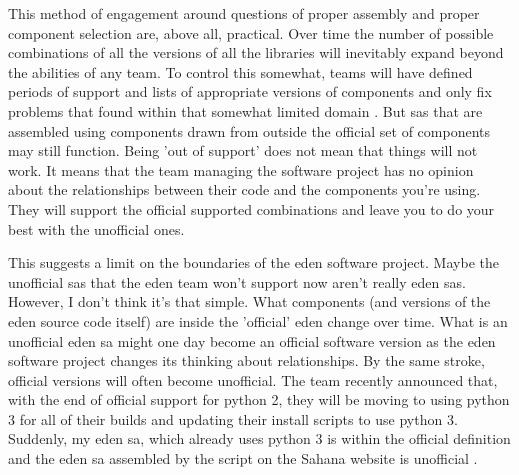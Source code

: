 \documentclass[a4paper,man,natbib,floatsintext]{apa6}
\begin{document}
   This method of engagement around questions of proper assembly and proper component selection are, above all, practical. Over time the number of possible combinations of all the versions of all the libraries will inevitably expand beyond the abilities of any team. To control this somewhat, teams will have defined periods of support and lists of appropriate versions of components and only fix problems that found within that somewhat limited domain \citep{Canonical2020-ru,Konig2019-ya}. But \glspl{sa} that are assembled using components drawn from outside the official set of components may still function. Being 'out of support' does not mean that things will not work. It means that the team managing the software project has no opinion about the relationships between their code and the components you're using. They will support the official supported combinations and leave you to do your best with the unofficial ones.

   This suggests a limit on the boundaries of the \acrshort{eden} software project. Maybe the unofficial \glspl{sa} that the \acrshort{eden} team won't support now aren't really \acrshort{eden} \glspl{sa}. However, I don't think it's that simple. What components (and versions of the \acrshort{eden} source code itself) are inside the 'official' \acrshort{eden} change over time. What is an unofficial \acrshort{eden} \gls{sa} might one day become an official software version as the \acrshort{eden} software project changes its thinking about relationships. By the same stroke, official versions will often become unofficial. The team recently announced that, with the end of official support for \gls{python} 2, they will be moving to using \gls{python} 3 for all of their builds and updating their install scripts to use \gls{python} 3. Suddenly, my \acrshort{eden} \gls{sa}, which already uses \gls{python} 3 is within the official definition and the \acrshort{eden} \gls{sa} assembled by the script on the Sahana website is unofficial \citep{Konig2019-ya,Sahana_Foundation2015-zs}. 

\end{document}
